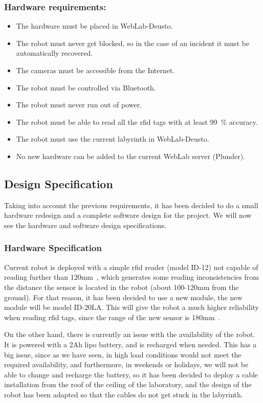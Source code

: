 \subsubsection{Hardware requirements:}

\begin{itemize}
	\item The hardware must be placed in WebLab-Deusto.
	\item The robot must never get blocked, so in the case of an incident it must be automatically
	recovered.
	\item The cameras must be accessible from the Internet.
	\item The robot must be controlled via Bluetooth.
	\item The robot must never run out of power.
	\item The robot must be able to read all the \acrshort{rfid} tags with at least 99~\% accuracy.
	\item The robot must use the current labyrinth in WebLab-Deusto.
	\item No new hardware can be added to the current WebLab server (Plunder).
\end{itemize}

\subsection{Design Specification}

Taking into account the previous requirements, it has been decided to do a small hardware redesign
and a complete software design for the project. We will now see the hardware and software design
specifications.

\subsubsection{Hardware Specification}

Current robot is deployed with a simple \acrshort{rfid} reader (model ID-12) not capable of reading
further than 120mm~\cite{rfid}, which generates some reading inconsistencies from the distance the
sensor is located in the robot (about 100-120mm from the ground). For that reason, it has been
decided to use a new module, the new module will be model ID-20LA. This will give the robot a much
higher reliability when reading \acrshort{rfid} tags, since the range of the new sensor is
180mm~\cite{rfid}.

On the other hand, there is currently an issue with the availability of the robot. It is powered
with a 2Ah \acrshort{lipo} battery, and is recharged when needed. This has a big issue, since as we
have seen, in high load conditions would not meet the required availability, and furthermore, in
weekends or holidays, we will not be able to change and recharge the battery, so it has been decided
to deploy a cable installation from the roof of the ceiling of the laboratory, and the design of the
robot has been adapted so that the cables do not get stuck in the labyrinth.

